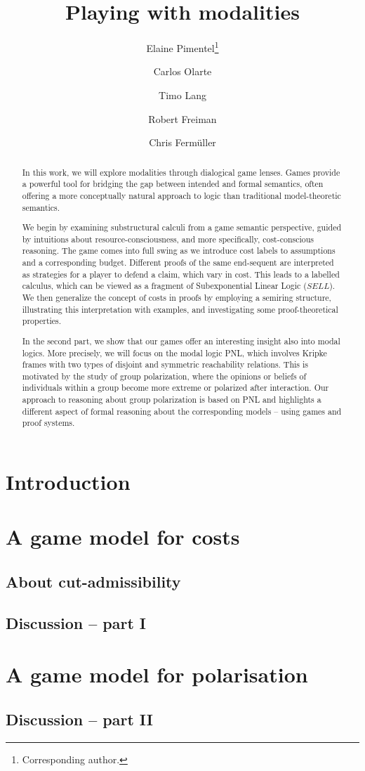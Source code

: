 \documentclass[a4paper,UKenglish,cleveref, autoref, thm-restate]{lipics-v2021}
\title{Playing with modalities}
\author{Elaine Pimentel\footnote{Corresponding author.}}{Computer Science Department UCL, UK \and \url{https://sites.google.com/site/elainepimentel/} }{e.pimentel@ucl.ac.uk}{https://orcid.org/0000-0002-7113-0801}{Pimentel has received funding from the European Union's Horizon 2020 research and innovation programme under the Marie Sk\l odowska-Curie grant agreement Number 101007627 and by the Leverhulme Project ECUMENICAL.}
\author{Carlos Olarte}{LIPN, CNRS UMR 7030, Universit\'{e} Sorbonne Paris Nord, France \and \url{https://sites.google.com/site/carlosolarte/} }{olarte@lipn.univ-paris13.fr}{https://orcid.org/0000-0002-7264-7773}{The work of Olarte has been partially supported by the SGR project PROMUEVA (BPIN
2021000100160) under the supervision of Minciencias (Ministerio de Ciencia Tecnolog\'ia e Innovaci\'on, Colombia). Olarte acknowledges also support from the NATO
Science for Peace
and Security Programme through grant number G6133 (project SymSafe). }
\author{Timo Lang}{Computer Science Department UCL, UK}{}{}{}
\author{Robert Freiman}{TU-Wien, Austria}{robert@logic.at}{}{}{}
\author{Chris Ferm\"{u}ller}{TU-Wien, Austria}{chrisf@logic.at}{}{}{}
\begin{document}
\maketitle

\begin{abstract}
In this work, we will explore modalities through dialogical game lenses. Games provide a powerful tool for bridging the gap between intended and formal semantics, often offering a more conceptually natural approach to logic than traditional model-theoretic semantics.

We begin by examining substructural calculi from a game semantic perspective, guided by intuitions about resource-consciousness, and more specifically, cost-conscious reasoning. The game comes into full swing as we introduce cost labels to assumptions and a corresponding budget. Different proofs of the same end-sequent are interpreted as strategies for a player to defend a claim, which vary in cost. This leads to a labelled calculus, which can be viewed as a fragment of Subexponential Linear Logic ($SELL$). We then generalize the concept of costs in proofs by employing a semiring structure, illustrating this interpretation with examples, and investigating some proof-theoretical properties.

In the second part, we show that our games offer an interesting insight also into modal logics. More precisely, we will focus on the modal logic PNL, which involves Kripke frames with two types of disjoint and symmetric reachability relations. This is motivated by the study of group polarization, where the opinions or beliefs of individuals within a group become more extreme or polarized after interaction. Our approach to reasoning about group polarization is based on PNL and highlights a different aspect of formal reasoning about the corresponding models -- using games and proof systems.

\end{abstract}

\section{Introduction}\label{sec:intro}


\section{A game model for costs}\label{sec:sell}

\subsection{About cut-admissibility}\label{subsec:cut}

\subsection{Discussion -- part I}\label{subsec:conc1}

\section{A game model for polarisation}

\subsection{Discussion -- part II}\label{subsec:conc2}


\end{document}
